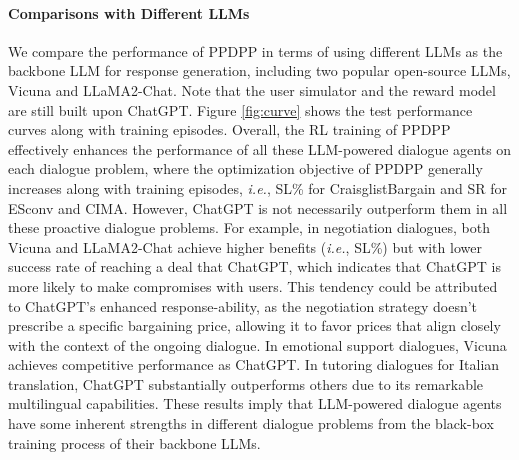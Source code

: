 \documentclass{article} %
\begin{document}
\paragraph{Comparisons with Different LLMs}
We compare the performance of PPDPP in terms of using different LLMs as the backbone LLM for response generation, including two popular open-source LLMs, Vicuna and LLaMA2-Chat. 
Note that the user simulator and the reward model are still built upon ChatGPT. 
Figure \ref{fig:curve} shows the test performance curves along with training episodes.  
Overall, the RL training of PPDPP effectively enhances the performance of all these LLM-powered dialogue agents on each dialogue problem, where the optimization objective of PPDPP generally increases along with training episodes, \textit{i.e.}, SL\% for CraisglistBargain and SR for ESconv and CIMA. 
However, ChatGPT is not necessarily outperform them in all these proactive dialogue problems.  For example, in negotiation dialogues, both Vicuna and LLaMA2-Chat achieve higher benefits (\textit{i.e.}, SL\%) but with lower success rate of reaching a deal that ChatGPT, which indicates that ChatGPT is more likely to make compromises with users. 
This tendency could be attributed to ChatGPT's enhanced response-ability, as the negotiation strategy doesn't prescribe a specific bargaining price, allowing it to favor prices that align closely with the context of the ongoing dialogue.
In emotional support dialogues, Vicuna achieves competitive performance as ChatGPT. 
In tutoring dialogues for Italian translation, ChatGPT substantially outperforms others due to its remarkable multilingual capabilities. 
These results imply that LLM-powered dialogue agents have some inherent strengths in different dialogue problems from the black-box training process of their backbone LLMs. 




\end{document}
